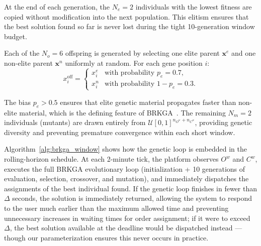 \documentclass[runningheads]{llncs}
\begin{document}
At the end of each generation, the $N_e = 2$ individuals with the lowest fitness are copied without modification into the next population. This elitism ensures that the best solution found so far is never lost during the tight 10-generation window budget.

Each of the $N_o = 6$ offspring is generated by selecting one elite parent $\mathbf{x}^e$ and one non-elite parent $\mathbf{x}^n$ uniformly at random.
For each gene position $i$:
\vspace{-1pt}
{\small
\begin{equation}
    x^{\text{off}}_i =
    \begin{cases}
        x^e_i & \text{with probability } p_e = 0.7, \\
        x^n_i & \text{with probability } 1 - p_e = 0.3.
    \end{cases}
\end{equation}
}

The bias $p_e > 0.5$ ensures that elite genetic material propagates faster than non-elite material, which is the defining feature of BRKGA~\cite{ref-goncalves2011}. The remaining $N_m = 2$ individuals (mutants) are drawn entirely from $\mathcal{U}[0,1]^{n_{O^w}+n_{C^w}}$, providing genetic diversity and preventing premature convergence within each short window.

\setlength{\parskip}{0pt}

Algorithm~\ref{alg:brkga_window} shows how the genetic loop is embedded in the rolling-horizon schedule. At each 2-minute tick, the platform observes $O^w$ and $C^w$, executes the full BRKGA evolutionary loop (initialization + 10 generations of evaluation, selection, crossover, and mutation), and immediately dispatches the
assignments of the best individual found. If the genetic loop finishes in fewer than $\Delta$ seconds, the solution is immediately returned, allowing the system to respond to the user much earlier than the maximum allowed time and preventing unnecessary increases in waiting times for order assignment; if it were to exceed $\Delta$, the best solution available at the deadline would be dispatched instead — though our parameterization ensures this never occurs in practice.
\end{document}
